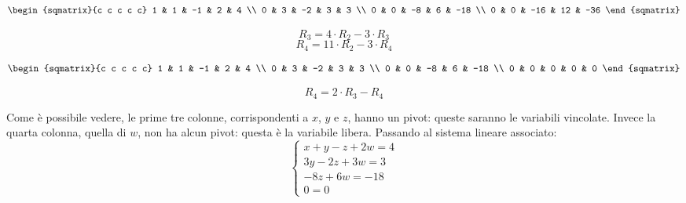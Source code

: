 \begin{esempio}
    \begin{center}
        \begin{minipage}{.4\textwidth}
            \[
                \begin{sqmatrix}{c c c c c}
                    1 & 1 & -1 & 2 & 4 \\
                    0 & 3 & -2 & 3 & 3 \\
                    0 & 0 & -8 & 6 & -18 \\
                    0 & 0 & -16 & 12 & -36
                \end{sqmatrix}
            \]
        \end{minipage}
        \begin{minipage}{.4\textwidth}
            \[
                R_3 = 4 \cdot R_2 - 3 \cdot R_3
            \]
            \[
                R_4 = 11 \cdot R_2 - 3 \cdot R_4
            \]
        \end{minipage}
    \end{center}
    \begin{center}
        \begin{minipage}{.4\textwidth}
            \[
                \begin{sqmatrix}{c c c c c}
                    1 & 1 & -1 & 2 & 4 \\
                    0 & 3 & -2 & 3 & 3 \\
                    0 & 0 & -8 & 6 & -18 \\
                    0 & 0 & 0 & 0 & 0
                \end{sqmatrix}
            \]
        \end{minipage}
        \begin{minipage}{.4\textwidth}
            \[
                R_4 = 2 \cdot R_3 - R_4
            \]
        \end{minipage}
    \end{center}
    Come è possibile vedere, le prime tre colonne, corrispondenti a $x$, $y$ e $z$, hanno un pivot: queste saranno le variabili vincolate. Invece la quarta colonna, quella di $w$, non ha alcun pivot: questa è la variabile libera. Passando al sistema lineare associato:
    \[
        \begin{cases}
            x + y - z + 2w = 4 \\
            3y - 2z + 3w = 3 \\
            -8z + 6w = -18 \\
            0 = 0
        \end{cases}
\]
\end{esempio}
